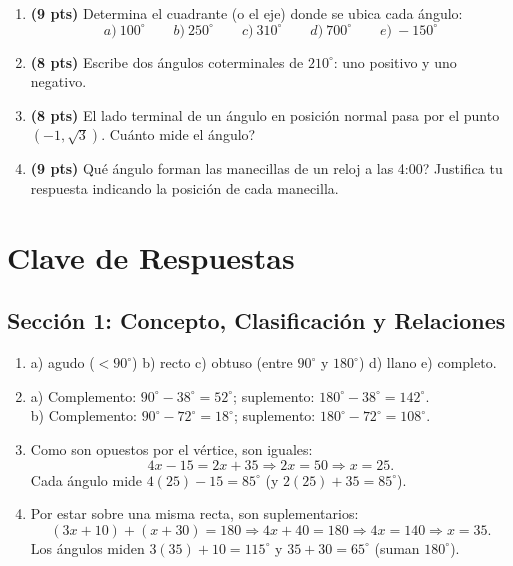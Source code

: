 \documentclass[12pt, letterpaper]{article}
\begin{document}
\begin{enumerate}[leftmargin=*]
  \item \textbf{(9 pts)} Determina el cuadrante (o el eje) donde se ubica cada ángulo:
        \[
          a)\ 100^{\circ} \qquad b)\ 250^{\circ} \qquad c)\ 310^{\circ} \qquad d)\ 700^{\circ} \qquad e)\ -150^{\circ}
        \]

  \item \textbf{(8 pts)} Escribe dos ángulos coterminales de $210^{\circ}$: uno positivo y uno negativo.

  \item \textbf{(8 pts)} El lado terminal de un ángulo en posición normal pasa por el punto $(-1, \sqrt{3})$. \textquestiondown Cuánto mide el ángulo?

  \item \textbf{(9 pts)} \textquestiondown Qué ángulo forman las manecillas de un reloj a las 4:00? Justifica tu respuesta indicando la posición de cada manecilla.
\end{enumerate}

\newpage

\ifmwclaves
  \section{Clave de Respuestas}

  \subsection*{Sección 1: Concepto, Clasificación y Relaciones}

  \begin{enumerate}[leftmargin=*, label=\textbf{\arabic*.}]
    \item a) agudo ($<90^{\circ}$) \quad b) recto \quad c) obtuso (entre $90^{\circ}$ y $180^{\circ}$) \quad d) llano \quad e) completo.

    \item a) Complemento: $90^{\circ} - 38^{\circ} = 52^{\circ}$; \quad suplemento: $180^{\circ} - 38^{\circ} = 142^{\circ}$.
          \\[2pt]
          b) Complemento: $90^{\circ} - 72^{\circ} = 18^{\circ}$; \quad suplemento: $180^{\circ} - 72^{\circ} = 108^{\circ}$.

    \item Como son opuestos por el vértice, son iguales:
          \[
            4x - 15 = 2x + 35 \Rightarrow 2x = 50 \Rightarrow x = 25.
          \]
          Cada ángulo mide $4(25) - 15 = 85^{\circ}$ (y $2(25) + 35 = 85^{\circ}$).

    \item Por estar sobre una misma recta, son suplementarios:
          \[
            (3x + 10) + (x + 30) = 180 \Rightarrow 4x + 40 = 180 \Rightarrow 4x = 140 \Rightarrow x = 35.
          \]
          Los ángulos miden $3(35) + 10 = 115^{\circ}$ y $35 + 30 = 65^{\circ}$ (suman $180^{\circ}$).
  \end{enumerate}
\end{document}
